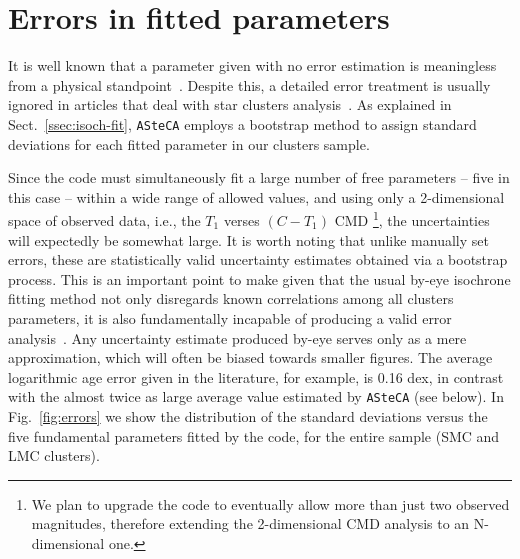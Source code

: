 \documentclass[draft]{aa}
\begin{document}

\section{Errors in fitted parameters}
\label{sec:errors-fit}

It is well known that a parameter given with no error estimation is
meaningless from a physical standpoint~\citep{Dolphin_2002,Andrae_2010}.
%
Despite this, a detailed error treatment is usually ignored in
articles that deal with star clusters analysis~\citep{Paunzen_2006}.
As explained in Sect.~\ref{ssec:isoch-fit}, \texttt{ASteCA} employs a bootstrap
method to assign standard deviations for each fitted parameter in our clusters
sample.

Since the code must simultaneously fit a large number of free parameters --
five in this case -- within a wide range of allowed values, and using only a
2-dimensional space of observed data, i.e., the $T_1$ verses $(C-T_1)$ CMD
\footnote{We plan to upgrade the code to eventually allow
more than just two observed magnitudes, therefore extending the 2-dimensional
CMD analysis to an N-dimensional one.}, the uncertainties will expectedly be
somewhat large.
%
It is worth noting that unlike manually set errors, these are
statistically valid uncertainty estimates obtained via a bootstrap process.
This is an important point to make given that the usual by-eye isochrone fitting
method not only disregards known correlations among all clusters parameters,
it is also fundamentally incapable of producing a valid error
analysis~\citep{Naylor_2006}. Any uncertainty estimate produced by-eye serves
only as a mere approximation, which will often be biased towards smaller
figures. The average logarithmic age error given in the literature, for example,
is 0.16 dex, in contrast with the almost twice as large average value estimated
by \texttt{ASteCA} (see below).
%
In Fig.~\ref{fig:errors} we show the distribution of the standard deviations
versus the five fundamental parameters fitted by the code, for the entire sample
(SMC and LMC clusters).
\end{document}
